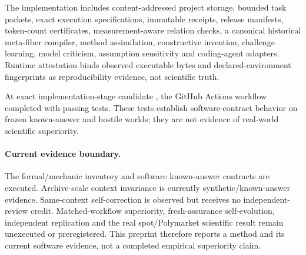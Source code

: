 The implementation includes content-addressed project storage, bounded task packets, exact execution specifications, immutable receipts, release manifests, token-count certificates, measurement-aware relation checks, a canonical historical meta-fiber compiler, method assimilation, constructive invention, challenge learning, model criticism, assumption sensitivity and coding-agent adapters. Runtime attestation binds observed executable bytes and declared-environment fingerprints as reproducibility evidence, not scientific truth.

At exact implementation-stage candidate \ImplementationSHA{}, the GitHub Actions workflow completed with \SoftwareTests{} passing tests. These tests establish software-contract behavior on frozen known-answer and hostile worlds; they are not evidence of real-world scientific superiority.

\paragraph{Current evidence boundary.} The formal/mechanic inventory and software known-answer contracts are executed. Archive-scale context invariance is currently synthetic/known-answer evidence. Same-context self-correction is observed but receives no independent-review credit. Matched-workflow superiority, fresh-assurance self-evolution, independent replication and the real spot/Polymarket scientific result remain unexecuted or preregistered. This preprint therefore reports a method and its current software evidence, not a completed empirical superiority claim.


